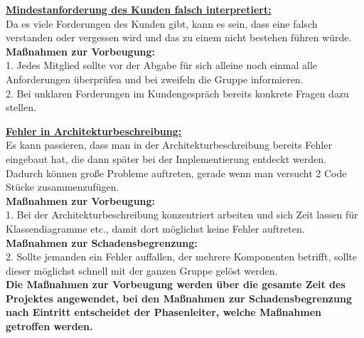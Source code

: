 \documentclass[fontsize=12pt,paper=a4,twoside]{scrartcl}
\begin{document}
\bigskip 

\textbf{\underline{Mindestanforderung des Kunden falsch interpretiert:}}\\
Da es viele Forderungen des Kunden gibt, kann es sein, dass eine falsch verstanden oder vergessen wird und das zu einem nicht bestehen führen würde.\\
\textbf{Maßnahmen zur Vorbeugung:}\\
1. Jedes Mitglied sollte vor der Abgabe für sich alleine noch einmal alle Anforderungen überprüfen und bei zweifeln die Gruppe informieren.\\
2. Bei unklaren Forderungen im Kundengespräch bereits konkrete Fragen dazu stellen.\\

\bigskip

\textbf{\underline{Fehler in Architekturbeschreibung:}}\\
Es kann passieren, dass man in der Architekturbeschreibung bereits Fehler eingebaut hat, die dann später bei der Implementierung entdeckt werden. Dadurch können große Probleme auftreten, gerade wenn man versucht 2 Code Stücke zusammenzufügen.\\
\textbf{Maßnahmen zur Vorbeugung:}\\
1. Bei der Architekturbeschreibung konzentriert arbeiten und sich Zeit lassen für Klassendiagramme etc., damit dort möglichst keine Fehler auftreten.\\
\textbf{Maßnahmen zur Schadensbegrenzung:}\\
2. Sollte jemanden ein Fehler auffallen, der mehrere Komponenten betrifft, sollte dieser möglichst schnell mit der ganzen Gruppe gelöst werden.\\ 

\bigskip 
\textbf{Die Maßnahmen zur Vorbeugung werden über die gesamte Zeit des Projektes angewendet, bei den Maßnahmen zur Schadensbegrenzung nach Eintritt entscheidet der Phasenleiter, welche Maßnahmen getroffen werden.}\\
\bigskip 
\end{document}
